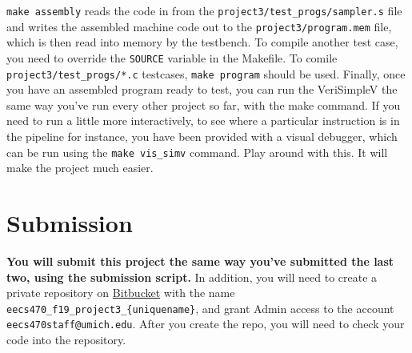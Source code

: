 \documentclass{article}
\begin{document}
\hrulefill

\texttt{make assembly} reads the code in from the \texttt{project3/test\_progs/sampler.s} file and writes the assembled machine code out to the \texttt{project3/program.mem} file, which is then read into memory by the testbench. To compile another test case, you need to override the \texttt{SOURCE} variable in the Makefile. To comile \texttt{project3/test\_progs/*.c} testcases, \texttt{make program} should be used. Finally, once you have an assembled program ready to test, you can run the VeriSimpleV the same way you've run every other project so far, with the make command. If you need to run a little more interactively, to see where a particular instruction is in the pipeline for instance, you have been provided with a visual debugger, which can be run using the \texttt{make vis\_simv} command. Play around with this. It will make the project much easier.

\section{Submission}
\textbf{You will submit this project the same way you've submitted the last two, using
the submission script.} In addition, you will need to create a private repository on \href{http://bitbucket.org}{Bitbucket} with the name \texttt{eecs470\_f19\_project3\_\{uniquename\}}, and grant Admin access to the account \texttt{eecs470staff@umich.edu}. After you create the repo, you will need to check your code into the repository.
\end{document}

